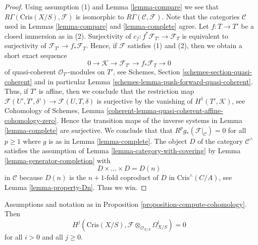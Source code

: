 \begin{proof}
Using assumption (1) and Lemma \ref{lemma-compare} we see that
$R\Gamma(\text{Cris}(X/S), \mathcal{F})$ is isomorphic to
$R\Gamma(\mathcal{C}, \mathcal{F})$. Note that the categories
$\mathcal{C}$ used in Lemmas \ref{lemma-compare} and \ref{lemma-complete}
agree. Let $f : T \to T'$ be a closed immersion as in (2). Surjectivity
of $c_f : f^*\mathcal{F}_{T'} \to \mathcal{F}_T$ is equivalent to
surjectivity of $\mathcal{F}_{T'} \to f_*\mathcal{F}_T$. Hence, if
$\mathcal{F}$ satisfies (1) and (2), then we obtain a short exact sequence
$$
0 \to \mathcal{K} \to \mathcal{F}_{T'} \to f_*\mathcal{F}_T \to 0
$$
of quasi-coherent $\mathcal{O}_{T'}$-modules on $T'$, see
Schemes, Section \ref{schemes-section-quasi-coherent} and in particular
Lemma \ref{schemes-lemma-push-forward-quasi-coherent}.
Thus, if $T'$ is affine, then we conclude that the restriction map
$\mathcal{F}(U', T', \delta') \to \mathcal{F}(U, T, \delta)$
is surjective by the vanishing of $H^1(T', \mathcal{K})$, see
Cohomology of Schemes, Lemma
\ref{coherent-lemma-quasi-coherent-affine-cohomology-zero}.
Hence the transition maps of the inverse systems in Lemma \ref{lemma-complete}
are surjective. We conclude that
that $R^pg_*(\mathcal{F}|_\mathcal{C}) = 0$ for all $p \geq 1$
where $g$ is as in Lemma \ref{lemma-complete}.
The object $D$ of the category $\mathcal{C}^\wedge$
satisfies the assumption of Lemma \ref{lemma-category-with-covering} by
Lemma \ref{lemma-generator-completion}
with
$$
D \times \ldots \times D = D(n)
$$
in $\mathcal{C}$ because $D(n)$ is the $n + 1$-fold coproduct of
$D$ in $\text{Cris}^\wedge(C/A)$, see Lemma \ref{lemma-property-Dn}.
Thus we win.
\end{proof}

\begin{lemma}
\label{lemma-cohomology-is-zero}
Assumptions and notation as in
Proposition \ref{proposition-compute-cohomology}.
Then
$$
H^j(\text{Cris}(X/S), \mathcal{F} \otimes_{\mathcal{O}_{X/S}} \Omega^i_{X/S})
= 0
$$
for all $i > 0$ and all $j \geq 0$.
\end{lemma}

